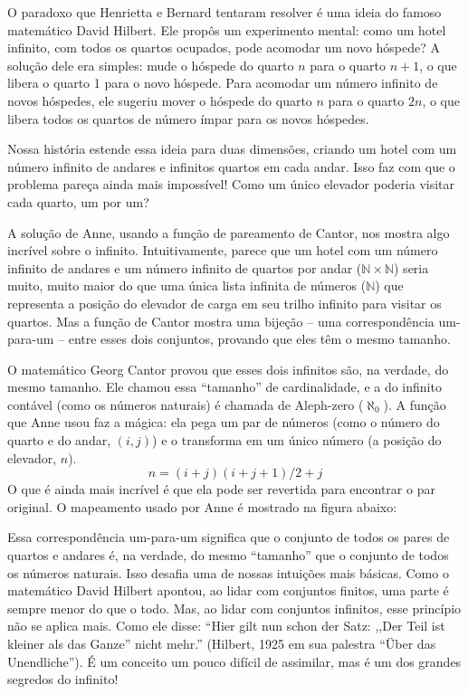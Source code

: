 O paradoxo que Henrietta e Bernard tentaram resolver é uma ideia do famoso matemático David Hilbert. Ele propôs um experimento mental: como um hotel infinito, com todos os quartos ocupados, pode acomodar um novo hóspede? A solução dele era simples: mude o hóspede do quarto $n$ para o quarto $n+1$, o que libera o quarto 1 para o novo hóspede. Para acomodar um número infinito de novos hóspedes, ele sugeriu mover o hóspede do quarto $n$ para o quarto $2n$, o que libera todos os quartos de número ímpar para os novos hóspedes.

Nossa história estende essa ideia para duas dimensões, criando um hotel com um número infinito de andares e infinitos quartos em cada andar. Isso faz com que o problema pareça ainda mais impossível! Como um único elevador poderia visitar cada quarto, um por um?

A solução de Anne, usando a função de pareamento de Cantor, nos mostra algo incrível sobre o infinito. Intuitivamente, parece que um hotel com um número infinito de andares e um número infinito de quartos por andar ($\mathbb{N}\times\mathbb{N}$) seria muito, muito maior do que uma única lista infinita de números ($\mathbb{N}$) que representa a posição do elevador de carga em seu trilho infinito para visitar os quartos. Mas a função de Cantor mostra uma bijeção -- uma correspondência um-para-um -- entre esses dois conjuntos, provando que eles têm o mesmo tamanho.

O matemático Georg Cantor provou que esses dois infinitos são, na verdade, do mesmo tamanho. Ele chamou essa ``tamanho'' de cardinalidade, e a do infinito contável (como os números naturais) é chamada de Aleph-zero ($\aleph_0$). A função que Anne usou faz a mágica: ela pega um par de números (como o número do quarto e do andar, $(i,j)$) e o transforma em um único número (a posição do elevador, $n$). 
$$n=(i+j)(i+j+1)/2+j$$
O que é ainda mais incrível é que ela pode ser revertida para encontrar o par original. O mapeamento usado por Anne é mostrado na figura abaixo:

\begin{center}

\end{center}


Essa correspondência um-para-um significa que o conjunto de todos os pares de quartos e andares é, na verdade, do mesmo ``tamanho'' que o conjunto de todos os números naturais. Isso desafia uma de nossas intuições mais básicas. Como o matemático David Hilbert apontou, ao lidar com conjuntos finitos, uma parte é sempre menor do que o todo. Mas, ao lidar com conjuntos infinitos, esse princípio não se aplica mais. Como ele disse: ``Hier gilt nun schon der Satz: ,,Der Teil ist kleiner als das Ganze'' nicht mehr.'' (Hilbert, 1925 em sua palestra ``\"{U}ber das Unendliche''). É um conceito um pouco difícil de assimilar, mas é um dos grandes segredos do infinito!
